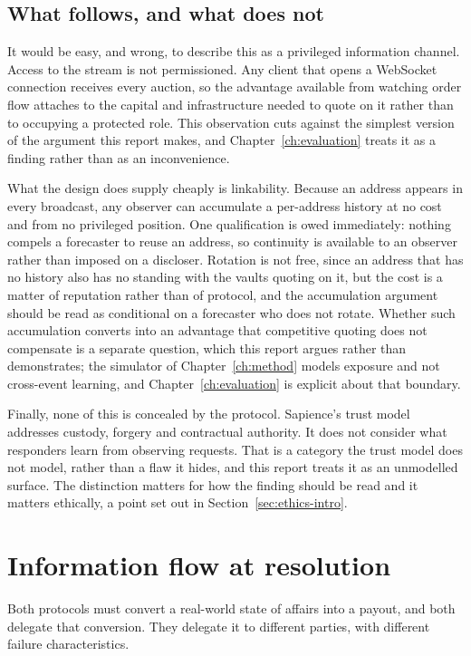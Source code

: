 \subsection{What follows, and what does not}

It would be easy, and wrong, to describe this as a privileged information channel. Access to
the stream is not permissioned. Any client that opens a WebSocket connection receives every
auction, so the advantage available from watching order flow attaches to the capital and
infrastructure needed to quote on it rather than to occupying a protected role. This
observation cuts against the simplest version of the argument this report makes, and
Chapter~\ref{ch:evaluation} treats it as a finding rather than as an inconvenience.

What the design does supply cheaply is linkability. Because an address appears in every
broadcast, any observer can accumulate a per-address history at no cost and from no
privileged position. One qualification is owed immediately: nothing compels a forecaster to
reuse an address, so continuity is available to an observer rather than imposed on a
discloser. Rotation is not free, since an address that has no history also has no standing
with the vaults quoting on it, but the cost is a matter of reputation rather than of
protocol, and the accumulation argument should be read as conditional on a forecaster who
does not rotate. Whether such accumulation converts into an advantage that competitive
quoting does not compensate is a separate question, which this report argues rather than
demonstrates; the simulator of Chapter~\ref{ch:method} models exposure and not cross-event
learning, and Chapter~\ref{ch:evaluation} is explicit about that boundary.

Finally, none of this is concealed by the protocol. Sapience's trust model addresses custody, forgery and
contractual authority. It does not consider what responders learn from observing requests. That is a category the trust model
does not model, rather than a flaw it hides, and this report treats it as an unmodelled
surface. The distinction matters for how the finding should be read and it matters ethically, a point set out in Section~\ref{sec:ethics-intro}.

\section{Information flow at resolution}
\label{sec:resflow}

Both protocols must convert a real-world state of affairs into a payout, and both delegate
that conversion. They delegate it to different parties, with different failure
characteristics.

